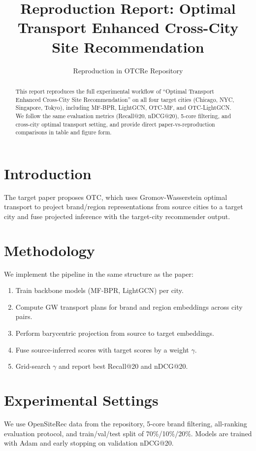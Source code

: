 \documentclass[10pt]{article}
\title{Reproduction Report: Optimal Transport Enhanced Cross-City Site Recommendation}
\author{Reproduction in OTCRe Repository}
\date{}
\begin{document}
\maketitle

\begin{abstract}
This report reproduces the full experimental workflow of ``Optimal Transport Enhanced Cross-City Site Recommendation'' on all four target cities (Chicago, NYC, Singapore, Tokyo), including MF-BPR, LightGCN, OTC-MF, and OTC-LightGCN. We follow the same evaluation metrics (Recall@20, nDCG@20), 5-core filtering, and cross-city optimal transport setting, and provide direct paper-vs-reproduction comparisons in table and figure form.
\end{abstract}

\section{Introduction}
The target paper proposes OTC, which uses Gromov-Wasserstein optimal transport to project brand/region representations from source cities to a target city and fuse projected inference with the target-city recommender output.

\section{Methodology}
We implement the pipeline in the same structure as the paper:
\begin{enumerate}
\item Train backbone models (MF-BPR, LightGCN) per city.
\item Compute GW transport plans for brand and region embeddings across city pairs.
\item Perform barycentric projection from source to target embeddings.
\item Fuse source-inferred scores with target scores by a weight $\gamma$.
\item Grid-search $\gamma$ and report best Recall@20 and nDCG@20.
\end{enumerate}

\section{Experimental Settings}
We use OpenSiteRec data from the repository, 5-core brand filtering, all-ranking evaluation protocol, and train/val/test split of 70\%/10\%/20\%. Models are trained with Adam and early stopping on validation nDCG@20.
\end{document}
